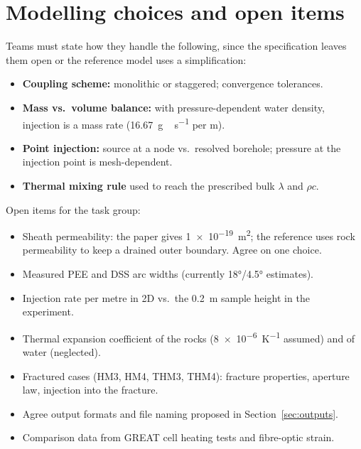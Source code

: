 \documentclass[11pt,a4paper]{article}
\newcommand{\open}{$\square$}
\begin{document}
\section{Modelling choices and open items}
\label{sec:open}
Teams must state how they handle the following, since the specification leaves
them open or the reference model uses a simplification:
\begin{itemize}
  \item \textbf{Coupling scheme:} monolithic or staggered; convergence tolerances.
  \item \textbf{Mass vs.\ volume balance:} with pressure-dependent water
        density, injection is a mass rate (\SI{16.67}{g\,s^{-1}} per m).
  \item \textbf{Point injection:} source at a node vs.\ resolved borehole;
        pressure at the injection point is mesh-dependent.
  \item \textbf{Thermal mixing rule} used to reach the prescribed bulk
        $\lambda$ and $\rho c$.
\end{itemize}

Open items for the task group:
\begin{itemize}[label=\open]
  \item Sheath permeability: the paper gives \SI{1e-19}{m^2}; the reference
        uses rock permeability to keep a drained outer boundary. Agree on one
        choice.
  \item Measured PEE and DSS arc widths (currently \ang{18}/\ang{4.5} estimates).
  \item Injection rate per metre in 2D vs.\ the \SI{0.2}{m} sample height in
        the experiment.
  \item Thermal expansion coefficient of the rocks (\SI{8e-6}{K^{-1}} assumed)
        and of water (neglected).
  \item Fractured cases (HM3, HM4, THM3, THM4): fracture properties, aperture
        law, injection into the fracture.
  \item Agree output formats and file naming proposed in Section~\ref{sec:outputs}.
  \item Comparison data from GREAT cell heating tests and fibre-optic strain.
\end{itemize}

\nocite{McDermott2018,Kolditz2025,Mollaali2026}


\end{document}
